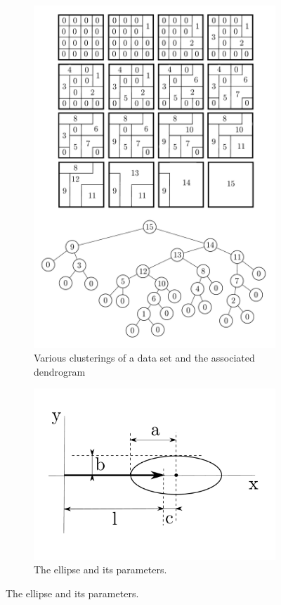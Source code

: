 \begin{figure}[h]
	\centering
	\begin{subfigure}{0.5\textwidth}
		\includegraphics[width=\textwidth]{./illustrations/telea-dendrogram-embedded_font.pdf}
    	\caption{Various clusterings of a data set and the associated dendrogram}
	\end{subfigure}
    \qquad
    \begin{subfigure}{0.4\textwidth}
		\includegraphics[width=\textwidth]{./illustrations/telea-ellipse_params-embedded_font.pdf}
    	\caption{The ellipse and its parameters.}
    

\end{subfigure}
\end{figure}
